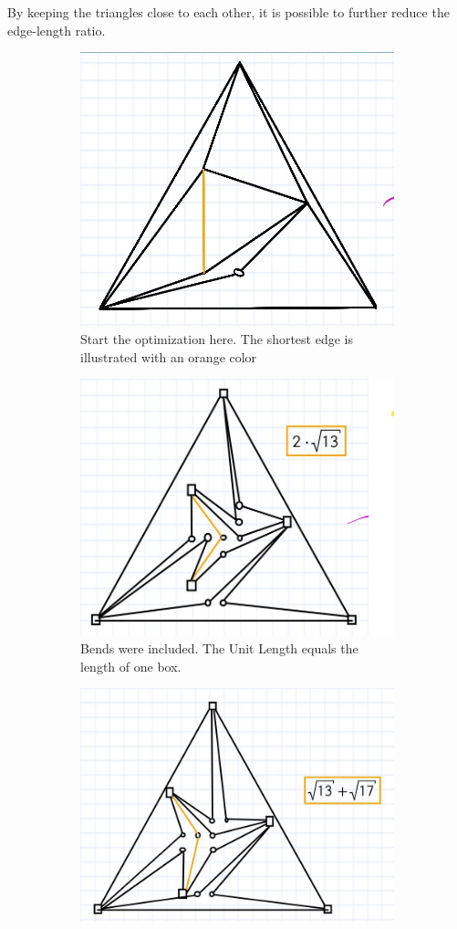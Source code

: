 \begin{observation}
	By \grqq keeping the triangles close to each other\grqq, it is possible to further reduce the edge-length ratio.
\end{observation}
\begin{figure}[H]
	\centering
	\begin{subfigure}{0.8\textwidth}
		\centering
		\includegraphics[width=0.5\linewidth]{drawings/two_triangles_1.jpg}
		\caption{Start the optimization here. The shortest edge is illustrated with an orange color}
	\end{subfigure}
	\begin{subfigure}{0.8\textwidth}
	\centering
	\includegraphics[width=0.5\linewidth]{drawings/two_triangles_2.jpg}
	\caption{Bends were included. The Unit Length equals the length of one box.}
\end{subfigure}
	\begin{subfigure}{0.8\textwidth}
	\centering
	\includegraphics[width=0.5\linewidth]{drawings/two_triangles_3.jpg}

\end{subfigure}
\end{figure}
